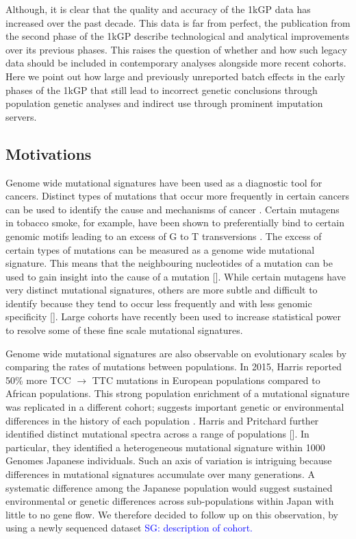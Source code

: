 \documentclass[9pt,lineno]{elife}
\newcommand{\sgcomment}[1]{\textcolor{blue}{SG: #1}}
\begin{document}
Although, it is clear that the quality and accuracy of the 1kGP data has increased over the past decade. 
This data is far from perfect, the publication from the second phase of the 1kGP describe technological and analytical improvements over its previous phases.
This raises the question of whether and how such legacy data should be included in contemporary analyses alongside more recent cohorts. 
Here we point out how large and previously unreported batch effects in the early phases of the 1kGP that still lead to incorrect genetic conclusions through population genetic analyses and indirect use through prominent imputation servers.  

\subsection{Motivations}

Genome wide mutational signatures have been used as a diagnostic tool for cancers\cite{Pleasance2010,Shiraishi2015a}.
Distinct types of mutations that occur more frequently in certain cancers can be used to identify the cause and mechanisms of cancer \cite{Pleasance2010,Shiraishi2015a}.
Certain mutagens in tobacco smoke, for example, have been shown to preferentially bind to certain genomic motifs leading to an excess of G to T transversions \cite{Pleasance2010}.
The excess of certain types of mutations can be measured as a genome wide mutational signature.
This means that the neighbouring nucleotides of a mutation can be used to gain insight into the cause of a mutation [\cite{}].
While certain mutagens have very distinct mutational signatures, others are more subtle and difficult to identify because they tend to occur less frequently and with less genomic specificity [\cite{}].
Large cohorts have recently been used to increase statistical power to resolve some of these fine scale mutational signatures.

Genome wide mutational signatures are also observable on evolutionary scales by comparing the rates of mutations between populations. 
In 2015, Harris reported 50\% more TCC ${\rightarrow}$ TTC mutations in European populations compared to African populations.
This strong population enrichment of a mutational signature was replicated in a different cohort; suggests important genetic or environmental differences in the history of each population \cite{}. 
Harris and Pritchard further identified distinct mutational spectra across a range of populations [\cite{}]. 
In particular, they identified a heterogeneous mutational signature within 1000 Genomes Japanese individuals. 
Such an axis of variation is intriguing because differences in mutational signatures accumulate over many generations. 
A systematic difference among the Japanese population would suggest sustained environmental or genetic differences across sub-populations within Japan with little to no gene flow. 
We therefore decided to follow up on this observation, by using a newly sequenced dataset \sgcomment{description of cohort. }
\end{document}
